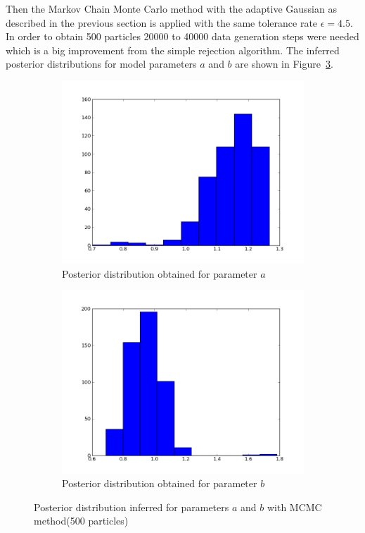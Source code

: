 \documentclass[12pt,a4paper,titlepage]{article}
\begin{document}
Then the Markov Chain Monte Carlo method with the adaptive Gaussian as described in the previous section is applied with the same tolerance rate $\epsilon = 4.5$.  In order to obtain 500 particles 20000 to 40000 data generation steps were needed which is a big improvement from the simple rejection algorithm. The inferred posterior distributions for model parameters $a$ and $b$ are shown in Figure~\ref{fig:mcmcdistros}.
\begin{figure}
\centering
\begin{subfigure}{.54\linewidth}
  \centering
  \includegraphics[width=0.9\linewidth]{mcmc500th1.png}
  \caption{Posterior distribution obtained for parameter $a$}
  \label{fig:t}
\end{subfigure}%
\begin{subfigure}{.54\linewidth}
  \centering
  \includegraphics[width=0.9\linewidth]{mcmc500th2.png}
  \caption{Posterior distribution obtained for parameter $b$}
  \label{fig:ps}
\end{subfigure}
\caption{Posterior distribution inferred for parameters $a$ and $b$ with MCMC method(500 particles)}
\label{fig:mcmcdistros}
\end{figure}
\end{document}
